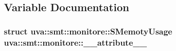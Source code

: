 \subsection{Variable Documentation}
\hypertarget{namespaceuva_1_1smt_1_1monitore_a1c42133abb9426e1cbeb32c20fa03450}{}
\subsubsection[{\+\_\+\+\_\+attribute\+\_\+\+\_\+}]{\setlength{\rightskip}{0pt plus 5cm}struct {\bf uva\+::smt\+::monitore\+::\+S\+Memoty\+Usage}  uva\+::smt\+::monitore\+::\+\_\+\+\_\+attribute\+\_\+\+\_\+}\label{namespaceuva_1_1smt_1_1monitore_a1c42133abb9426e1cbeb32c20fa03450}
